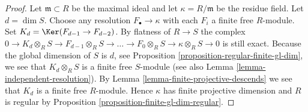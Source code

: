 \begin{proof}
Let $\mathfrak m \subset R$ be the maximal ideal
and let $\kappa = R/\mathfrak m$ be the residue field.
Let $d = \dim S$.
Choose any resolution $F_\bullet \to \kappa$
with each $F_i$ a finite free $R$-module. Set
$K_d = \Ker(F_{d - 1} \to F_{d - 2})$.
By flatness of $R \to S$ the complex
$0 \to K_d \otimes_R S \to F_{d - 1} \otimes_R S \to \ldots
\to F_0 \otimes_R S \to \kappa \otimes_R S \to 0$
is still exact. Because the global dimension of $S$
is $d$, see Proposition \ref{proposition-regular-finite-gl-dim},
we see that $K_d \otimes_R S$ is a finite free $S$-module
(see also Lemma \ref{lemma-independent-resolution}).
By Lemma \ref{lemma-finite-projective-descends} we see
that $K_d$ is a finite free $R$-module.
Hence $\kappa$ has finite projective dimension and $R$ is regular by
Proposition \ref{proposition-finite-gl-dim-regular}.
\end{proof}









